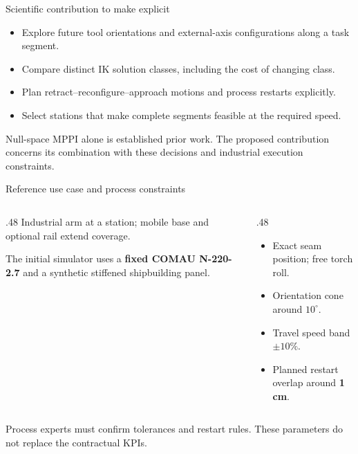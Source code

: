 \documentclass[aspectratio=169,10pt]{beamer}
\begin{document}
\begin{frame}{Scientific contribution to make explicit}
\begin{itemize}\items
\item Explore future tool orientations and external-axis configurations along a task segment.
\item Compare distinct IK solution classes, including the cost of changing class.
\item Plan retract--reconfigure--approach motions and process restarts explicitly.
\item Select stations that make complete segments feasible at the required speed.
\end{itemize}
\medskip
Null-space MPPI alone is established prior work. The proposed contribution concerns its combination with these decisions and industrial execution constraints.
\end{frame}

\begin{frame}{Reference use case and process constraints}
\begin{columns}[T]
\begin{column}{.48\textwidth}
Industrial arm at a station; mobile base and optional rail extend coverage.\par\medskip
The initial simulator uses a \textbf{fixed COMAU N-220-2.7} and a synthetic stiffened shipbuilding panel.
\end{column}
\begin{column}{.48\textwidth}
\begin{itemize}\items
\item Exact seam position; free torch roll.
\item Orientation cone around \textbf{$10^\circ$}.
\item Travel speed band \textbf{$\pm10\%$}.
\item Planned restart overlap around \textbf{1 cm}.
\end{itemize}
\end{column}
\end{columns}
\medskip\small Process experts must confirm tolerances and restart rules. These parameters do not replace the contractual KPIs.
\end{frame}
\end{document}
